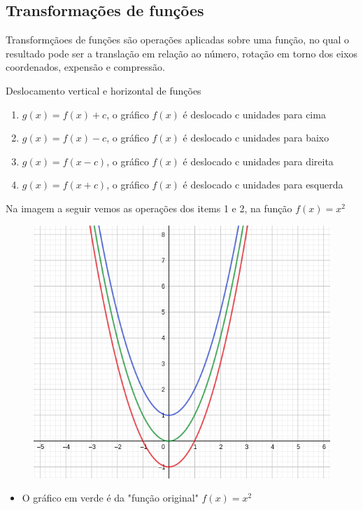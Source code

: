 \begin{multicols*}{2}
    \subsection*{Transformações de funções}
    Transformçãoes de funções são operações aplicadas sobre uma função, no qual o  resultado pode 			ser a translação em relação ao número, rotação em torno dos eixos coordenados, expensão e 				compressão.

    Deslocamento vertical e horizontal de funções
    \begin{enumerate}[wide, labelwidth=!, labelindent=0pt]
        \item $g(x) = f(x) + c$, o gráfico $f(x)$ é deslocado c unidades para cima
        \item $g(x) = f(x) - c $, o gráfico $f(x)$ é deslocado c unidades para baixo
        \item $g(x) = f(x - c) $, o gráfico $f(x)$ é deslocado c unidades para direita
        \item $g(x) = f(x + c) $, o gráfico $f(x)$ é deslocado c unidades para esquerda
    \end{enumerate}
    Na imagem a seguir vemos as operações dos items 1 e 2, na função $f(x) = x^2$
    \begin{figure}[H]
        \centering
        \includegraphics[scale=0.4]{assets/rafael/img7.png}
    \end{figure}
    \begin{itemize}[wide, labelwidth=!, labelindent=0pt]
        \item O gráfico em verde é da "função original" $f(x) = x^2$

\end{itemize}
\end{multicols*}
